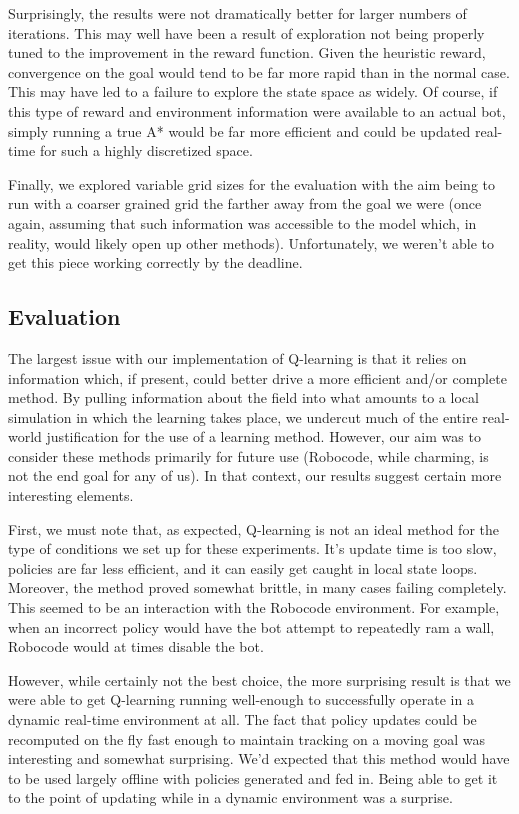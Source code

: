 \documentclass{aiaa-tc}%
\begin{document}
Surprisingly, the results were not dramatically better for larger
numbers of iterations. This may well have been a result of exploration
not being properly tuned to the improvement in the reward
function. Given the heuristic reward, convergence on the goal would
tend to be far more rapid than in the normal case. This may have led to a failure to explore
the state space as widely. Of course, if this type
of reward and environment information were available to an actual bot,
simply
running a true A* would be far more
efficient and could be updated real-time for such a highly discretized
space.

Finally, we explored variable grid sizes for the evaluation with the
aim being to run with a coarser grained grid the farther away from the
goal we were (once again, assuming that such information was
accessible to the model which, in reality, would likely open up other
methods). Unfortunately, we weren't able to get this piece working
correctly by the deadline.

\subsection{Evaluation}

The largest issue with our implementation of Q-learning is that it
relies on information which, if present, could better drive a more
efficient and/or complete method. By pulling information about the
field into what amounts to a local simulation in which the learning
takes place, we undercut much of the entire real-world justification for the
use of a learning method. However, our aim was to consider these
methods primarily for future use (Robocode, while charming, is not the
end goal for any of us). In that context, our results suggest certain
more interesting elements.

First, we must note that, as expected, Q-learning is not an ideal method for the type of
conditions we set up for these experiments. It's update time is too
slow, policies are far less efficient, and it can easily get caught in
local state loops. Moreover, the method proved somewhat brittle, in
many cases failing completely. This seemed to be an interaction with
the Robocode environment. For example, when an incorrect policy would
have the bot attempt to repeatedly ram a wall, Robocode would at times
disable the bot.

However, while certainly not the best choice, the more surprising
result is that we were able to get Q-learning running well-enough to
successfully operate in a dynamic real-time environment at all. The
fact that policy updates could be recomputed on the fly fast enough to
maintain tracking on a moving goal was interesting and somewhat
surprising. We'd expected that this method would have to be used
largely offline with policies generated and fed in. Being able to get
it to the point of updating while in a dynamic environment was a surprise.
\end{document}
